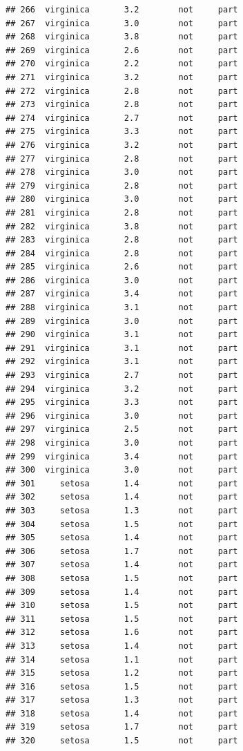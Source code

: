 \documentclass[krantz2]{krantz}\usepackage{knitr}%
\begin{document}
\begin{knitrout}
\begin{kframe}
\begin{verbatim}
## 266  virginica       3.2        not     part
## 267  virginica       3.0        not     part
## 268  virginica       3.8        not     part
## 269  virginica       2.6        not     part
## 270  virginica       2.2        not     part
## 271  virginica       3.2        not     part
## 272  virginica       2.8        not     part
## 273  virginica       2.8        not     part
## 274  virginica       2.7        not     part
## 275  virginica       3.3        not     part
## 276  virginica       3.2        not     part
## 277  virginica       2.8        not     part
## 278  virginica       3.0        not     part
## 279  virginica       2.8        not     part
## 280  virginica       3.0        not     part
## 281  virginica       2.8        not     part
## 282  virginica       3.8        not     part
## 283  virginica       2.8        not     part
## 284  virginica       2.8        not     part
## 285  virginica       2.6        not     part
## 286  virginica       3.0        not     part
## 287  virginica       3.4        not     part
## 288  virginica       3.1        not     part
## 289  virginica       3.0        not     part
## 290  virginica       3.1        not     part
## 291  virginica       3.1        not     part
## 292  virginica       3.1        not     part
## 293  virginica       2.7        not     part
## 294  virginica       3.2        not     part
## 295  virginica       3.3        not     part
## 296  virginica       3.0        not     part
## 297  virginica       2.5        not     part
## 298  virginica       3.0        not     part
## 299  virginica       3.4        not     part
## 300  virginica       3.0        not     part
## 301     setosa       1.4        not     part
## 302     setosa       1.4        not     part
## 303     setosa       1.3        not     part
## 304     setosa       1.5        not     part
## 305     setosa       1.4        not     part
## 306     setosa       1.7        not     part
## 307     setosa       1.4        not     part
## 308     setosa       1.5        not     part
## 309     setosa       1.4        not     part
## 310     setosa       1.5        not     part
## 311     setosa       1.5        not     part
## 312     setosa       1.6        not     part
## 313     setosa       1.4        not     part
## 314     setosa       1.1        not     part
## 315     setosa       1.2        not     part
## 316     setosa       1.5        not     part
## 317     setosa       1.3        not     part
## 318     setosa       1.4        not     part
## 319     setosa       1.7        not     part
## 320     setosa       1.5        not     part

\end{verbatim}
\end{kframe}
\end{knitrout}
\end{document}
